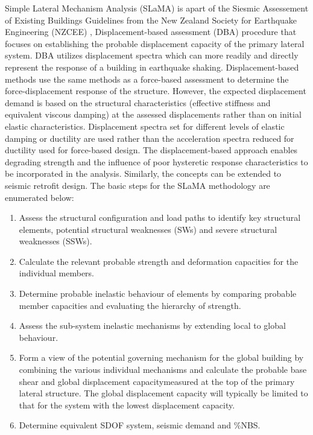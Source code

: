 Simple Lateral Mechanism Analysis (SLaMA) is apart of the Siesmic Assessement of Existing Buildings Guidelines from the New Zealand Society for Earthquake Engineering (NZCEE) \cite{NZSEE2019},  Displacement-based assessment (DBA) procedure that focuses on establishing the probable displacement capacity of the primary lateral system. DBA utilizes displacement spectra which can more readily and directly represent the response of a building in earthquake shaking. Displacement-based methods use the same methods as a force-based assessment to determine the force-displacement response of the structure. However, the expected displacement demand is based on the structural characteristics (effective stiffness and equivalent viscous damping) at the assessed displacements rather than on initial elastic characteristics. Displacement spectra set for different levels of elastic damping or ductility are used rather than the acceleration spectra reduced for ductility used for force-based design. The displacement-based approach enables degrading strength and the influence of poor
hysteretic response characteristics to be incorporated in the analysis. Similarly, the concepts can be extended to seismic retrofit design. The basic steps for the SLaMA methodology are enumerated below:

\begin{enumerate}
    \item Assess the structural configuration and load paths to identify key structural elements, potential structural weaknesses (SWs) and severe structural weaknesses (SSWs).
    \item Calculate the relevant probable strength and deformation capacities for the individual members.
    \item Determine probable inelastic behaviour of elements by comparing probable member capacities and evaluating the hierarchy of strength.
    \item Assess the sub-system inelastic mechanisms by extending local to global behaviour.
    \item Form a view of the potential governing mechanism for the global building by combining the various individual mechanisms and calculate the probable base shear and global displacement capacitymeasured at the top of the primary lateral structure. The global displacement capacity will typically be limited to that for the system with the lowest displacement capacity.
    \item Determine equivalent SDOF system, seismic demand and \%NBS.
\end{enumerate}

